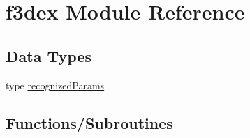 \hypertarget{namespacef3dex}{
\section{f3dex Module Reference}
\label{namespacef3dex}
}
\subsection*{Data Types}
\begin{DoxyCompactItemize}
\item 
type \hyperlink{typef3dex_1_1recognized_params}{recognizedParams}
\end{DoxyCompactItemize}
\subsection*{Functions/Subroutines}
